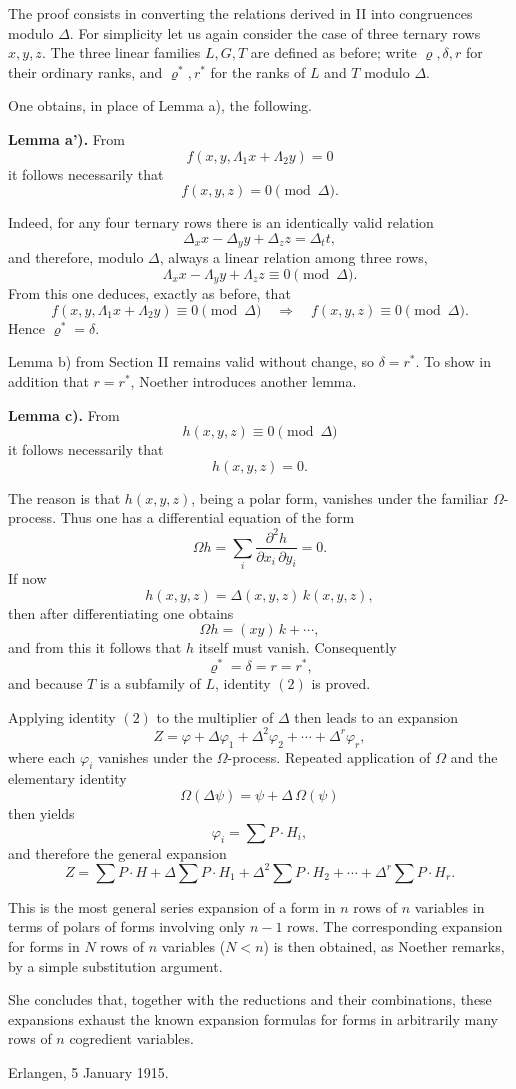 \documentclass[11pt]{article}
\begin{document}
The proof consists in converting the relations derived in II into congruences modulo \(\Delta\). For simplicity let us again consider the case of three ternary rows \(x,y,z\). The three linear families \(L,G,T\) are defined as before; write \(\varrho,\delta,r\) for their ordinary ranks, and \(\varrho^*,r^*\) for the ranks of \(L\) and \(T\) modulo \(\Delta\).

One obtains, in place of Lemma a), the following.

\medskip
\noindent\textbf{Lemma a').}
From
\[
f(x,y,\Lambda_1x+\Lambda_2y)=0
\]
it follows necessarily that
\[
f(x,y,z)=0\pmod{\Delta}.
\]

Indeed, for any four ternary rows there is an identically valid relation
\[
\Delta_x x-\Delta_y y+\Delta_z z=\Delta_t t,
\]
and therefore, modulo \(\Delta\), always a linear relation among three rows,
\[
\Lambda_x x-\Lambda_y y+\Lambda_z z\equiv 0 \pmod{\Delta}.
\]
From this one deduces, exactly as before, that
\[
f(x,y,\Lambda_1x+\Lambda_2y)\equiv 0 \pmod{\Delta}
\quad\Rightarrow\quad
f(x,y,z)\equiv 0 \pmod{\Delta}.
\]
Hence \(\varrho^*=\delta\).

Lemma b) from Section II remains valid without change, so \(\delta=r^*\). To show in addition that \(r=r^*\), Noether introduces another lemma.

\medskip
\noindent\textbf{Lemma c).}
From
\[
h(x,y,z)\equiv 0 \pmod{\Delta}
\]
it follows necessarily that
\[
h(x,y,z)=0.
\]

The reason is that \(h(x,y,z)\), being a polar form, vanishes under the familiar \(\Omega\)-process. Thus one has a differential equation of the form
\[
\Omega h=\sum_i \frac{\partial^2 h}{\partial x_i\,\partial y_i}=0.
\]
If now
\[
h(x,y,z)=\Delta(x,y,z)\,k(x,y,z),
\]
then after differentiating one obtains
\[
\Omega h=(xy)\,k+\cdots,
\]
and from this it follows that \(h\) itself must vanish. Consequently
\[
\varrho^*=\delta=r=r^*,
\]
and because \(T\) is a subfamily of \(L\), identity \((2)\) is proved.

Applying identity \((2)\) to the multiplier of \(\Delta\) then leads to an expansion
\[
Z=\varphi+\Delta\varphi_1+\Delta^2\varphi_2+\cdots+\Delta^r\varphi_r,
\]
where each \(\varphi_i\) vanishes under the \(\Omega\)-process. Repeated application of \(\Omega\) and the elementary identity
\[
\Omega(\Delta\psi)=\psi+\Delta\,\Omega(\psi)
\]
then yields
\[
\varphi_i=\sum P\cdot H_i,
\]
and therefore the general expansion
\[
Z=
\sum P\cdot H
+\Delta\sum P\cdot H_1
+\Delta^2\sum P\cdot H_2
+\cdots
+\Delta^r\sum P\cdot H_r.
\tag{3}
\]

This is the most general series expansion of a form in \(n\) rows of \(n\) variables in terms of polars of forms involving only \(n-1\) rows. The corresponding expansion for forms in \(N\) rows of \(n\) variables (\(N<n\)) is then obtained, as Noether remarks, by a simple substitution argument.

She concludes that, together with the reductions and their combinations, these expansions exhaust the known expansion formulas for forms in arbitrarily many rows of \(n\) cogredient variables.

\medskip
\noindent
Erlangen, 5 January 1915.
\end{document}
